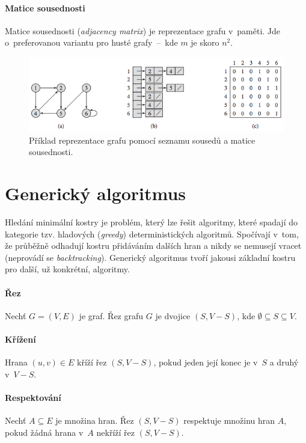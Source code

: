 \paragraph*{Matice sousednosti} Matice sousednosti (\textit{adjacency matrix}) je reprezentace grafu v~paměti. Jde o~preferovanou variantu pro husté grafy~--~kde $m$ je skoro $n^2$.

\begin{figure}[H]
    \centering
    \includegraphics[width=1\linewidth]{graph_representations_example.png}
    \caption{Příklad reprezentace grafu pomocí seznamu sousedů a matice sousednosti.}
\end{figure}


\section{Generický algoritmus}

Hledání minimální kostry je problém, který lze řešit algoritmy, které spadají do kategorie tzv. hladových (\textit{greedy}) deterministických algoritmů. Spočívají v~tom, že průběžně odhadují kostru přidáváním dalších hran a nikdy se nemusejí vracet (neprovádí se \textit{backtracking}). Generický algoritmus tvoří jakousi základní kostru pro další, už konkrétní, algoritmy.

\paragraph*{Řez} Nechť $G = (V, E)$ je graf. Řez grafu $G$ je dvojice $(S, V - S)$, kde $\emptyset \subseteq S \subseteq V$.

\paragraph*{Křížení} Hrana $(u, v) \in E$ kříží řez $(S, V - S)$, pokud jeden její konec je v~$S$ a druhý v~$V - S$.

\paragraph*{Respektování} Nechť $A \subseteq E$ je množina hran. Řez $(S, V - S)$ respektuje množinu hran $A$, pokud žádná hrana v~$A$ nekříží řez $(S, V - S)$.

